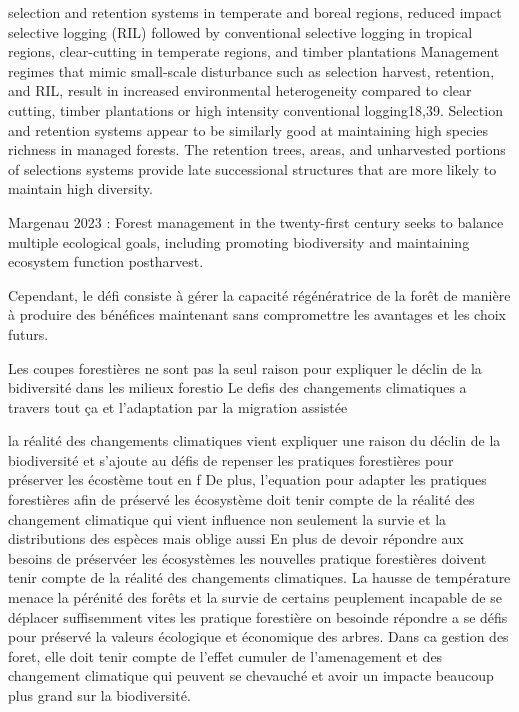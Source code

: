 selection and retention systems in temperate and boreal regions, reduced impact selective logging (RIL) followed by conventional selective logging in tropical regions, clear-cutting in temperate regions, and timber plantations
Management regimes that mimic small-scale disturbance such as selection harvest, retention, and RIL, result in increased environmental heterogeneity compared to clear cutting, timber plantations or high intensity conventional logging18,39. Selection and retention systems appear to be similarly good at maintaining high species richness in managed forests.
The retention trees, areas, and unharvested portions of selections systems provide late successional structures that are more likely to maintain high diversity.


Margenau 2023 : Forest management in the twenty-first century seeks to balance multiple ecological goals, including promoting biodiversity and maintaining ecosystem function postharvest.

Cependant, le défi consiste à gérer la capacité régénératrice de la forêt de manière à produire des bénéfices maintenant sans compromettre les avantages et les choix futurs.

Les coupes forestières ne sont pas la seul raison pour expliquer le déclin de la bidiversité dans les milieux forestio
Le defis des changements climatiques a travers tout ça et l'adaptation par la migration assistée

    la réalité des changements climatiques vient expliquer une raison du déclin de la biodiversité et s'ajoute au défis de repenser les pratiques forestières pour préserver les écostème tout en f
    De plus, l'equation pour adapter les pratiques forestières afin de préservé les écosystème doit tenir compte de la réalité des changement climatique qui vient influence non seulement la survie et la distributions des espèces mais oblige aussi 
    En plus de devoir répondre aux besoins de préservéer les écosystèmes les nouvelles pratique forestières doivent tenir compte de la réalité des changements climatiques.
    La hausse de température menace la pérénité des forêts et la survie de certains peuplement incapable de se déplacer suffisemment vites
    les pratique forestière on besoinde répondre a se défis pour préservé la valeurs écologique et économique des arbres.
    Dans ca gestion des foret, elle doit tenir compte de l'effet cumuler de l'amenagement et des changement climatique qui peuvent se chevauché et avoir un impacte beaucoup plus grand sur la biodiversité.

